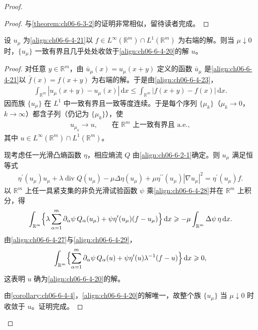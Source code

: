 \documentclass[../../main.tex]{subfiles}
\begin{document}
\begin{proof}
\begin{proof}
与\cref{theorem:ch06-6-3-2}的证明非常相似，留待读者完成。
\end{proof}

\begin{lemma}\label{lemma:ch06-6-4-7}
设 $u_{\mu}$ 为\eqref{align:ch06-6-4-21}以 $f\in L^{\infty}(\mathbb{R}^{m})\cap L^{1}(\mathbb{R}^{m})$ 为右端的解。则当 $\mu\downarrow 0$ 时，$\{u_{\mu}\}$ 一致有界且几乎处处收敛于\eqref{align:ch06-6-4-20}的解 $u$。
\end{lemma}

\begin{proof}
对任意 $y\in\mathbb{R}^{m}$，由 $\bar{u}_{\mu}(x)=u_{\mu}(x+y)$ 定义的函数 $\bar{u}_{\mu}$ 是\eqref{align:ch06-6-4-21}以 $\bar{f}(x)=f(x+y)$ 为右端的解。于是由\eqref{align:ch06-6-4-23}，
\begin{align}
\int_{\mathbb{R}^{m}}|u_{\mu}(x+y)-u_{\mu}(x)|\,\mathrm{d}x\leqslant\int_{\mathbb{R}^{m}}|f(x+y)-f(x)|\,\mathrm{d}x.
\label{align:ch06-6-4-26}
\end{align}
因而族 $\{u_{\mu}\}$ 在 $L^{1}$ 中一致有界且一致等度连续。于是每个序列 $\{\mu_{k}\}$（$\mu_{k}\to 0$，$k\to\infty$）都含子列（仍记为 $\{\mu_{k}\}$），使
\begin{align}
u_{\mu_{k}}\to u,\qquad\text{在 }\mathbb{R}^{m}\text{ 上一致有界且 a.e.},
\label{align:ch06-6-4-27}
\end{align}
其中 $u\in L^{\infty}(\mathbb{R}^{m})\cap L^{1}(\mathbb{R}^{m})$。

现考虑任一光滑凸熵函数 $\eta$，相应熵流 $Q$ 由\eqref{align:ch06-6-2-1}确定。则 $u_{\mu}$ 满足恒等式
\begin{align}
\eta^{\prime}(u_{\mu})u_{\mu}+\lambda\operatorname{div}Q(u_{\mu})-\mu\Delta\eta(u_{\mu})+\mu\eta^{\prime\prime}(u_{\mu})|\nabla u_{\mu}|^{2}=\eta^{\prime}(u_{\mu})f.
\label{align:ch06-6-4-28}
\end{align}
以 $\mathbb{R}^{m}$ 上任一具紧支集的非负光滑试验函数 $\psi$ 乘\eqref{align:ch06-6-4-28}并在 $\mathbb{R}^{m}$ 上积分，得
\begin{align}
\int_{\mathbb{R}^{m}}\Bigl{\{}\lambda\sum_{\alpha=1}^{m}\partial_{\alpha}\psi\,Q_{\alpha}(u_{\mu})+\psi\eta^{\prime}(u_{\mu})(f-u_{\mu})\Bigr{\}}\,\mathrm{d}x\geqslant-\mu\int_{\mathbb{R}^{m}}\Delta\psi\,\eta\,\mathrm{d}x.
\label{align:ch06-6-4-29}
\end{align}
由\eqref{align:ch06-6-4-27}与\eqref{align:ch06-6-4-29}，
\begin{align}
\int_{\mathbb{R}^{m}}\Bigl{\{}\sum_{\alpha=1}^{m}\partial_{\alpha}\psi\,Q_{\alpha}(u)+\psi\eta^{\prime}(u)\lambda^{-1}(f-u)\Bigr{\}}\,\mathrm{d}x\geqslant 0,
\label{align:ch06-6-4-30}
\end{align}
这表明 $u$ 确为\eqref{align:ch06-6-4-20}的解。

由\cref{corollary:ch06-6-4-4}，\eqref{align:ch06-6-4-20}的解唯一，故整个族 $\{u_{\mu}\}$ 当 $\mu\downarrow 0$ 时收敛于 $u$。证明完成。
\end{proof}
\end{proof}
\end{document}
